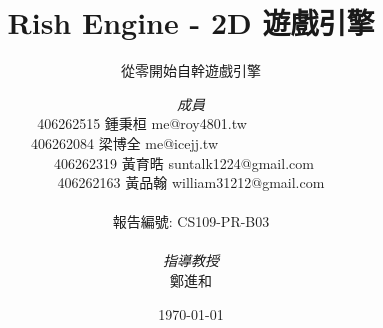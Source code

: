 \documentclass[a4paper, 12pt]{report}
\institute{輔仁大學資訊工程學系}
\title{Rish Engine - 2D 遊戲引擎}
\subtitle{從零開始自幹遊戲引擎}
\author{\textit{成員} \\
	406262515 \textsc{鍾秉桓} me@roy4801.tw\ \ \ \ \ \ \ \ \ \ \ \ \ \ \\
    406262084 \textsc{梁博全} me@icejj.tw\ \ \ \ \ \ \ \ \ \ \ \ \ \ \ \ \ \ \  \\
    406262319 \textsc{黃育晧} suntalk1224@gmail.com\ \  \\
    406262163 \textsc{黃品翰} william31212@gmail.com \\
    \ \\
    報告編號: CS109-PR-B03 \\
    \ \\
    \textit{指導教授} \\
    鄭進和
}
\date{\today}
\begin{document}
    \romantableofcontents

    \listoffigures

    

    \printbibliography
\end{document}
